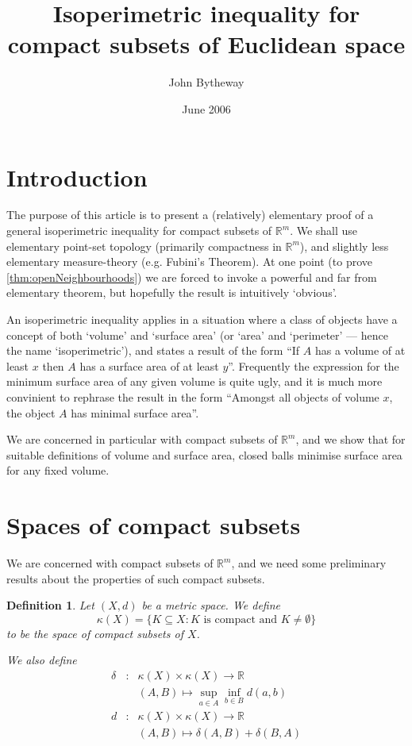 \documentclass[a4paper,11pt]{article}
\newcommand{\bbR}{\mathbb{R}}
\newtheorem{defn}[thm]{Definition}
\begin{document}
\title{Isoperimetric inequality for compact subsets of Euclidean space}
\author{John Bytheway}
\date{June 2006}
\maketitle

\tableofcontents

\setlength{\parindent}{0pt}
\setlength{\parskip}{1ex plus 0.5ex minus 0.2ex}

\section{Introduction}
The purpose of this article is to present a (relatively) elementary proof of
a general isoperimetric inequality for compact subsets of $\bbR^m$.  We shall
use elementary point-set topology (primarily compactness in $\bbR^m$), and
slightly less elementary measure-theory (e.g. Fubini's Theorem).  At one point
(to prove \vref{thm:openNeighbourhoods}) we are forced to invoke a powerful
and far from elementary theorem, but hopefully the result is intuitively
`obvious'.

An isoperimetric inequality applies in a situation where a class of objects
have a concept of both `volume' and `surface area' (or `area' and `perimeter'
--- hence the name `isoperimetric'), and states a result of the form ``If $A$
has a volume of at least $x$ then $A$ has a surface area of at least $y$''.
Frequently the expression for the minimum surface area of any given volume is
quite ugly, and it is much more convinient to rephrase the result in the form
``Amongst all objects of volume $x$, the object $A$ has minimal surface area''.

We are concerned in particular with compact subsets of $\bbR^m$, and we show
that for suitable definitions of volume and surface area, closed balls minimise
surface area for any fixed volume.

\section{Spaces of compact subsets}
We are concerned with compact subsets of $\bbR^m$, and we need
some preliminary results about the properties of such compact subsets.

\begin{defn}
Let $(X,d)$ be a metric space.  We define
\[
\kappa(X)=\{K\subseteq X:K\textrm{ is compact and }K\not=\emptyset\}
\]
to be the \emph{space of compact subsets} of $X$.

We also define
\begin{eqnarray*}
\delta &:& \kappa(X)\times\kappa(X)\to\bbR \\
&& (A,B)\mapsto \sup_{a\in A}\inf_{b\in B}d(a,b) \\
d &:& \kappa(X)\times\kappa(X)\to\bbR \\
&& (A,B)\mapsto \delta(A,B)+\delta(B,A)
\end{eqnarray*}
\end{defn}
\end{document}
